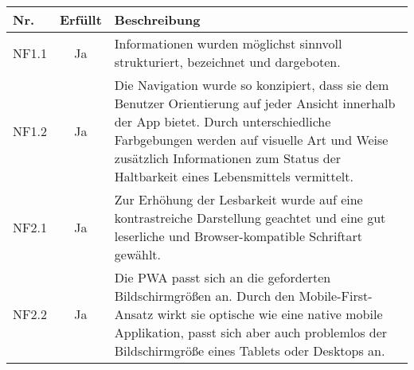 \begin{tabular}{lcp{12.3cm}}
	\textbf{Nr.} & \textbf{Erfüllt} & \textbf{Beschreibung}\\
	\hline
	NF1.1 & Ja & Informationen wurden möglichst sinnvoll strukturiert, bezeichnet und dargeboten.\\
	NF1.2 & Ja & Die Navigation wurde so konzipiert, dass sie dem Benutzer Orientierung auf jeder Ansicht innerhalb der App bietet. Durch unterschiedliche Farbgebungen werden auf visuelle Art und Weise zusätzlich Informationen zum Status der Haltbarkeit eines Lebensmittels vermittelt.\\
	NF2.1 & Ja & Zur Erhöhung der Lesbarkeit wurde auf eine kontrastreiche Darstellung geachtet und eine gut leserliche und Browser-kompatible Schriftart gewählt.\\
	NF2.2 & Ja & Die PWA passt sich an die geforderten Bildschirmgrößen an. Durch den Mobile-First-Ansatz wirkt sie optische wie eine native mobile Applikation, passt sich aber auch problemlos der Bildschirmgröße eines Tablets oder Desktops an.\\
	\hline
\end{tabular}